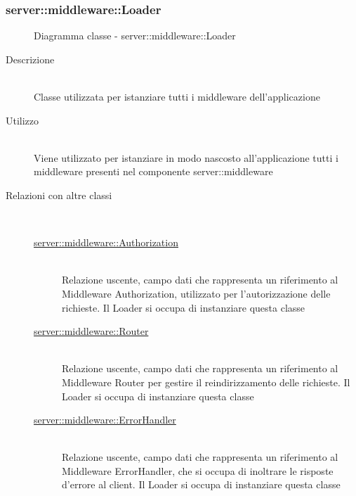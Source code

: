 \vspace{0.5cm}
\hypertarget{server::middleware::Loader}{}
\subsubsection[Loader]{server::middleware::Loader}
\begin{figure}[H]
	\centering
	\caption{Diagramma classe - server::middleware::Loader}
\end{figure}\begin{description}
\item[Descrizione] \hfill \\
Classe utilizzata per istanziare tutti i middleware dell'applicazione
\item[Utilizzo] \hfill \\
Viene utilizzato per istanziare in modo nascosto all’applicazione tutti i middleware presenti nel componente server::middleware
\item[Relazioni con altre classi] \hfill \\
\vspace{-7mm}
\begin{description}
	\item[\hyperlink{server::middleware::Authorization}{server::middleware::Authorization}] \hfill \\
	Relazione uscente, campo dati che rappresenta un riferimento al Middleware Authorization, utilizzato per l'autorizzazione delle richieste. Il Loader si occupa di instanziare questa classe
	\item[\hyperlink{server::middleware::Router}{server::middleware::Router}] \hfill \\
	Relazione uscente, campo dati che rappresenta un riferimento al Middleware Router per gestire il reindirizzamento delle richieste. Il Loader si occupa di instanziare questa classe
	\item[\hyperlink{server::middleware::ErrorHandler}{server::middleware::ErrorHandler}] \hfill \\
	Relazione uscente, campo dati che rappresenta un riferimento al Middleware ErrorHandler, che si occupa di inoltrare le risposte d'errore al client. Il Loader si occupa di instanziare questa classe
\end{description}


\end{description}
